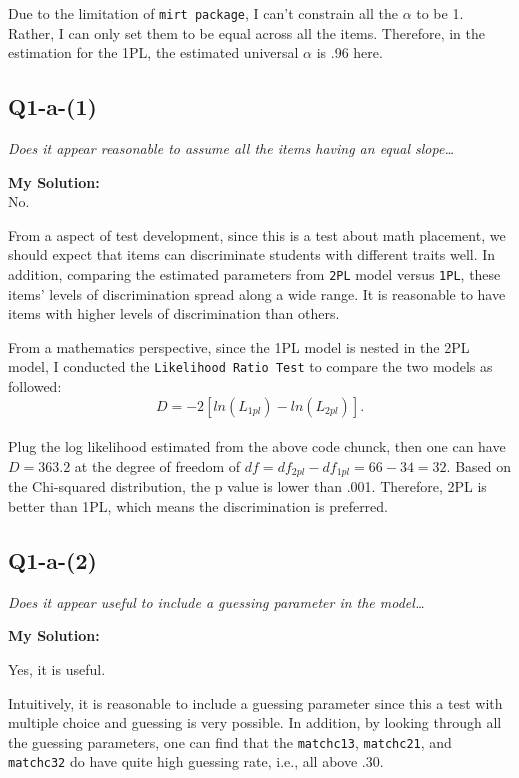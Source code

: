 \documentclass[
]{article}
\begin{document}
Due to the limitation of \texttt{mirt\ package}, I can't constrain all
the \(\alpha\) to be 1. Rather, I can only set them to be equal across
all the items. Therefore, in the estimation for the 1PL, the estimated
universal \(\alpha\) is .96 here.

\hypertarget{q1-a-1}{%
\subsection{Q1-a-(1)}\label{q1-a-1}}

\emph{Does it appear reasonable to assume all the items having an equal
slope\ldots{}}

\textbf{My Solution:}\\
No.~

From a aspect of test development, since this is a test about math
placement, we should expect that items can discriminate students with
different traits well. In addition, comparing the estimated parameters
from \texttt{2PL} model versus \texttt{1PL}, these items' levels of
discrimination spread along a wide range. It is reasonable to have items
with higher levels of discrimination than others.

From a mathematics perspective, since the 1PL model is nested in the 2PL
model, I conducted the \texttt{Likelihood\ Ratio\ Test} to compare the
two models as followed: \[D = -2[ln(L_{1pl})-ln(L_{2pl})] .\]\\
Plug the log likelihood estimated from the above code chunck, then one
can have \(D = 363.2\) at the degree of freedom of
\(df = df_{2pl}-df_{1pl} = 66-34 =32\). Based on the Chi-squared
distribution, the p value is lower than .001. Therefore, 2PL is better
than 1PL, which means the discrimination is preferred.

\hypertarget{q1-a-2}{%
\subsection{Q1-a-(2)}\label{q1-a-2}}

\emph{Does it appear useful to include a guessing parameter in the
model\ldots{}}

\textbf{My Solution:}

Yes, it is useful.

Intuitively, it is reasonable to include a guessing parameter since this
a test with multiple choice and guessing is very possible. In addition,
by looking through all the guessing parameters, one can find that the
\texttt{matchc13}, \texttt{matchc21}, and \texttt{matchc32} do have
quite high guessing rate, i.e., all above .30.
\end{document}
